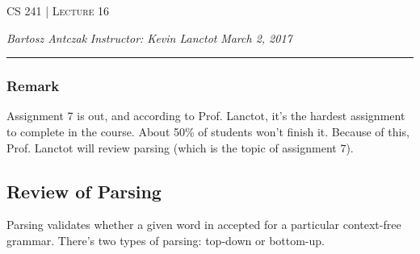 \documentclass{report}
\newcommand{\lectureNum}{16}
\newcommand{\curDate}{March 2, 2017}
\newcommand{\course}{CS 241}
\newcommand{\instructor}{Kevin Lanctot}
\begin{document}
\begin{center}
\begin{Large}
\textsc{\course{} | Lecture \lectureNum{}}
\end{Large}
\end{center} 
\noindent \textit{Bartosz Antczak} \hfill
\textit{Instructor: \instructor{}} \hfill
\textit{\curDate{}}
\rule{\textwidth}{0.4pt}
\subsubsection{Remark}
Assignment 7 is out, and according to Prof. Lanctot, it's the hardest assignment to complete in the course. About 50\% of students won't finish it. Because of this, Prof. Lanctot will review parsing (which is the topic of assignment 7).
\subsection{Review of Parsing}
Parsing validates whether a given word in accepted for a particular context-free grammar. There's two types of parsing: top-down or bottom-up.
\end{document}
